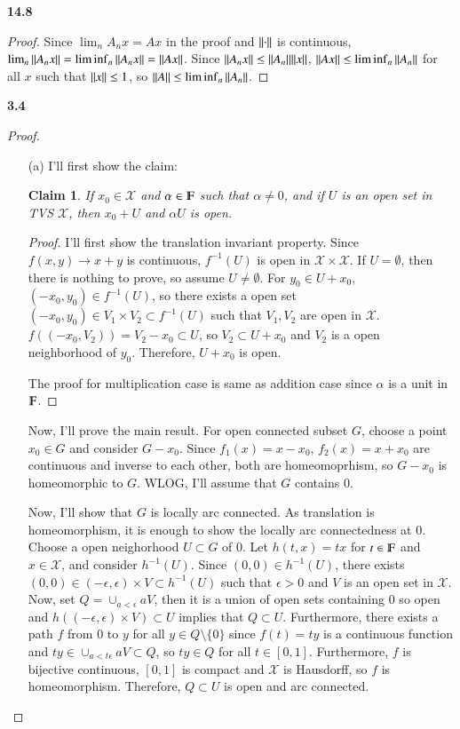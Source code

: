 \documentclass[a4paper, 12pt]{article}
\theoremstyle{Mydefinition}
\theoremstyle{Mytheorem}
\newtheorem{claim}{Claim}
\begin{document}
\noindent \textbf{14.8}
\begin{proof}
Since $\lim_n A_nx = Ax$ in the proof and $\norm{\cdot}$ is continuous, $\lim_n \norm{A_n x} = \liminf_n \norm{A_n x} = \norm{A x}$. Since $\norm{A_n x}\leq \norm{A_n}\norm{x}$, $\norm{A x}\leq \liminf_n \norm{A_n}$ for all $x$ such that $\norm{x}\leq 1$, so $\norm{A}\leq \liminf_n \norm{A_n}$.
\end{proof}

\noindent \textbf{3.4}
\begin{proof}
\begin{enumerate}
    \item[(a)] I'll first show the claim:
    \begin{claim}
    If $x_0\in \mathscr{X}$ and $\alpha\in \varmathbb{F}$ such that $\alpha\neq 0$, and if $U$ is an open set in TVS $\mathscr{X}$, then $x_0+U$ and $\alpha U$ is open.
    \end{claim}
    \begin{proof}
    I'll first show the translation invariant property. Since $f(x,y)\rightarrow x+y$ is continuous, $f^{-1}(U)$ is open in $\mathscr{X}\times\mathscr{X}$. If $U=\emptyset$, then there is nothing to prove, so assume $U\neq \emptyset$. For $y_0\in U+x_0$, $(-x_0, y_0)\in f^{-1}(U)$, so there exists a open set $(-x_0, y_0)\in V_1\times V_2\subset f^{-1}(U)$ such that $V_1,V_2$ are open in $\mathscr{X}$. $f((-x_0, V_2)) = V_2-x_0\subset U$, so $V_2\subset U+x_0$ and $V_2$ is a open neighborhood of $y_0$. Therefore, $U+x_0$ is open.
    
    The proof for multiplication case is same as addition case since $\alpha$ is a unit in $\varmathbb{F}$.
    \end{proof}
    
    Now, I'll prove the main result. For open connected subset $G$, choose a point $x_0\in G$ and consider $G-x_0$. Since $f_1(x) = x-x_0$, $f_2(x) = x+x_0$ are continuous and inverse to each other, both are homeomoprhism, so $G-x_0$ is homeomorphic to $G$. WLOG, I'll assume that $G$ contains $0$.
    
    Now, I'll show that $G$ is locally arc connected. As translation is homeomorphism, it is enough to show the locally arc connectedness at $0$. Choose a open neighorhood $U\subset G$ of $0$. Let $h(t,x) = tx$ for $t\in \varmathbb{F}$ and $x\in \mathscr{X}$, and consider $h^{-1}(U)$. Since $(0,0)\in h^{-1}(U)$, there exists $(0,0)\in (-\epsilon, \epsilon)\times V\subset h^{-1}(U)$ such that $\epsilon>0$ and $V$ is an open set in $\mathscr{X}$. Now, set $Q = \cup_{a< \epsilon}aV$, then it is a union of open sets containing $0$ so open and $h((-\epsilon, \epsilon)\times V)\subset U$ implies that $Q\subset U$. Furthermore, there exists a path $f$ from $0$ to $y$ for all $y\in Q\setminus \{0\}$ since $f(t) = ty$ is a continuous function and $ty \in \cup_{a<t\epsilon}aV\subset Q$, so $ty\in Q$ for all $t\in [0,1]$. Furthermore, $f$ is bijective continuous, $[0,1]$ is compact and $\mathscr{X}$ is Hausdorff, so $f$ is homeomorphism. Therefore, $Q\subset U$ is open and arc connected.
    

\end{enumerate}
\end{proof}
\end{document}
